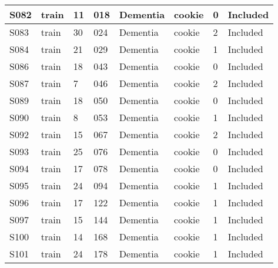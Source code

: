 \begin{center}
\begin{longtable}{|l|l|l|l|l|l|l|l|}
S082           & train                 & 11              & 018     & Dementia       & cookie          & 0            & Included      \\ \hline
S083           & train                 & 30              & 024     & Dementia       & cookie          & 2            & Included      \\ \hline
S084           & train                 & 21              & 029     & Dementia       & cookie          & 1            & Included      \\ \hline
S086           & train                 & 18              & 043     & Dementia       & cookie          & 0            & Included      \\ \hline
S087           & train                 & 7               & 046     & Dementia       & cookie          & 2            & Included      \\ \hline
S089           & train                 & 18              & 050     & Dementia       & cookie          & 0            & Included      \\ \hline
S090           & train                 & 8               & 053     & Dementia       & cookie          & 1            & Included      \\ \hline
S092           & train                 & 15              & 067     & Dementia       & cookie          & 2            & Included      \\ \hline
S093           & train                 & 25              & 076     & Dementia       & cookie          & 0            & Included      \\ \hline
S094           & train                 & 17              & 078     & Dementia       & cookie          & 0            & Included      \\ \hline
S095           & train                 & 24              & 094     & Dementia       & cookie          & 1            & Included      \\ \hline
S096           & train                 & 17              & 122     & Dementia       & cookie          & 1            & Included      \\ \hline
S097           & train                 & 15              & 144     & Dementia       & cookie          & 1            & Included      \\ \hline
S100           & train                 & 14              & 168     & Dementia       & cookie          & 1            & Included      \\ \hline
S101           & train                 & 24              & 178     & Dementia       & cookie          & 1            & Included      \\ \hline

\end{longtable}
\end{center}
